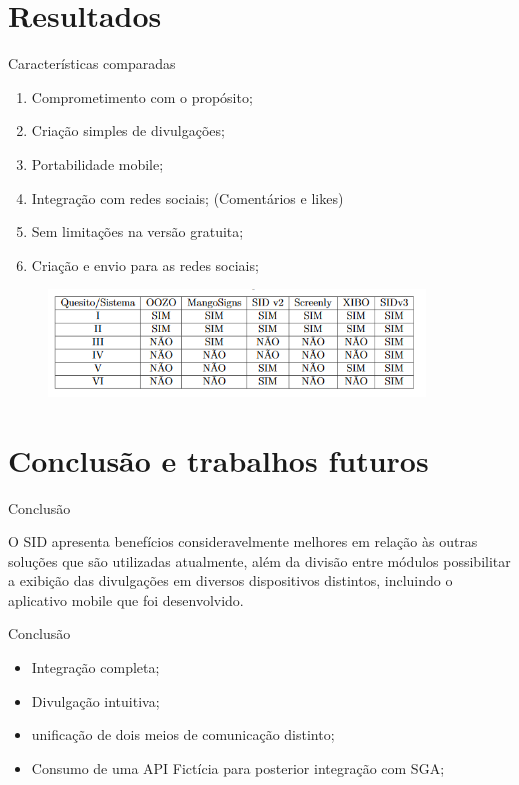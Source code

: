 \documentclass{aula-ifb}
\begin{document}
\section{Resultados}
\begin{frame}{Características comparadas}
	\begin{enumerate}
		\item Comprometimento com o propósito;
		\item Criação simples de divulgações;
		\item Portabilidade mobile;
		\item Integração com redes sociais; (Comentários e likes)
		\item Sem limitações na versão gratuita;
		\item Criação e envio para as redes sociais;
	\end{enumerate}
	\begin{figure}[h]
		\includegraphics[width=10cm]{figuras/tabela.png}
		\label{fig:figuramobile3}
	\end{figure}
\end{frame}

\section{Conclusão e trabalhos futuros}
\begin{frame}{Conclusão}
\begin{center}
O SID apresenta benefícios consideravelmente melhores em relação às outras soluções que são utilizadas atualmente, além da divisão entre módulos possibilitar a exibição das divulgações em diversos dispositivos distintos, incluindo o aplicativo mobile que foi desenvolvido.
\end{center}
\end{frame}

\begin{frame}{Conclusão}
\begin{itemize}
\item Integração completa;
\item Divulgação intuitiva;
\item unificação de dois meios de comunicação distinto;
\item Consumo de uma API Fictícia para posterior integração com SGA;
\end{itemize}
\end{frame}
\end{document}
